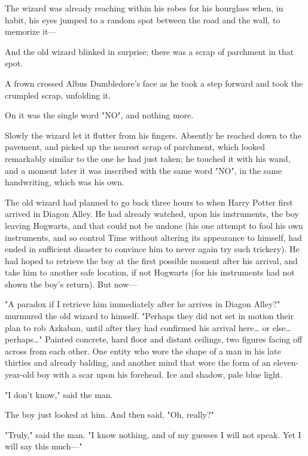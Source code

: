 The wizard was already reaching within his robes for his hourglass when, in 
habit, his eyes jumped to a random spot between the road and the wall, to 
memorize it---

And the old wizard blinked in surprise; there was a scrap of parchment in that 
spot.

A frown crossed Albus Dumbledore's face as he took a step forward and took the 
crumpled scrap, unfolding it.

On it was the single word "NO", and nothing more.

Slowly the wizard let it flutter from his fingers. Absently he reached down to 
the pavement, and picked up the nearest scrap of parchment, which looked 
remarkably similar to the one he had just taken; he touched it with his wand, 
and a moment later it was inscribed with the same word "NO", in the same 
handwriting, which was his own.

The old wizard had planned to go back three hours to when Harry Potter first 
arrived in Diagon Alley. He had already watched, upon his instruments, the boy 
leaving Hogwarts, and that could not be undone (his one attempt to fool his own 
instruments, and so control Time without altering its appearance to himself, 
had ended in sufficient disaster to convince him to never again try such 
trickery). He had hoped to retrieve the boy at the first possible moment after 
his arrival, and take him to another safe location, if not Hogwarts (for his 
instruments had not shown the boy's return). But now---

"A paradox if I retrieve him immediately after he arrives in Diagon Alley?" 
murmured the old wizard to himself. "Perhaps they did not set in motion their 
plan to rob Azkaban, until after they had confirmed his arrival here{\ldots} or 
else{\ldots} perhaps{\ldots}"
\sbreak
Painted concrete, hard floor and distant ceilings, two figures facing off 
across from each other. One entity who wore the shape of a man in his late 
thirties and already balding, and another mind that wore the form of an 
eleven-year-old boy with a scar upon his forehead. Ice and shadow, pale blue 
light.

"I don't know," said the man.

The boy just looked at him. And then said, "Oh, really?"

"Truly," said the man. "I know nothing, and of my guesses I will not speak. Yet 
I will say this much---"
